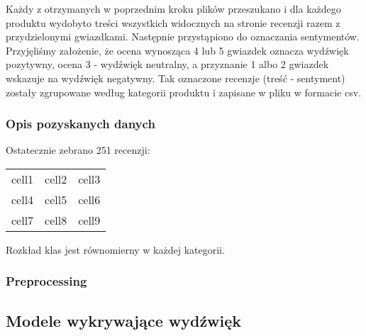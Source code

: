Każdy z otrzymanych w poprzednim kroku plików przeszukano i dla każdego produktu wydobyto treści wszystkich widocznych na stronie recenzji razem z przydzielonymi gwiazdkami. Następnie przystąpiono do oznaczania sentymentów. Przyjęliśmy założenie, że ocena wynosząca 4 lub 5 gwiazdek oznacza wydźwięk pozytywny, ocena 3 - wydźwięk neutralny, a przyznanie 1 albo 2 gwiazdek wskazuje na wydźwięk negatywny. Tak oznaczone recenzje (treść - sentyment) zostały zgrupowane według kategorii produktu i zapisane w pliku w formacie csv.

\subsubsection{Opis pozyskanych danych}

Ostatecznie zebrano 251 recenzji:

\begin{center}
\begin{tabular}{ c c c }
 cell1 & cell2 & cell3 \\ 
 cell4 & cell5 & cell6 \\  
 cell7 & cell8 & cell9    
\end{tabular}
\end{center}

Rozkład klas jest równomierny w każdej kategorii.

\subsubsection{Preprocessing}

\subsection{Modele wykrywające wydźwięk}